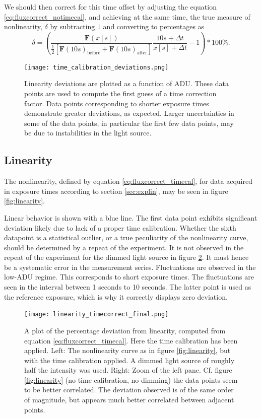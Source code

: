\documentclass[../main.tex]{subfiles}
\begin{document}
We should then correct for this time offset by adjusting the equation \ref{eq:fluxcorrect_notimecal}, and achieving at the same time, the true measure of nonlinearity, $\delta$ by subtracting $1$ and converting to percentages as 
		\begin{equation}\label{eq:fluxcorrect_timecal}
		\delta = \left( \frac{\bm F(x [s])}{\frac12\left[\bm F(10s)_\text{before}+\bm F(10s)_\text{after}\right]}\frac{10s + \Delta t}{x [s] + \Delta t} - 1 \right) * 100\%.
		\end{equation}
	
		\begin{figure}[h!]
		\centering			\texttt{[image: time\_calibration\_deviations.png]}
		\caption{Linearity deviations are plotted as a function of ADU. These data points are used to compute the first guess of a time correction factor. Data points corresponding to shorter exposure times demonstrate greater deviations, as expected. Larger uncertainties in some of the data points, in particular the first few data points, may be due to instabilities in the light source. }
		\label{fig:timecaldev}
	\end{figure}
		
		\subsection{Linearity}
		The nonlinearity, defined by equation \ref{eq:fluxcorrect_timecal}, for data acquired in exposure times according to section \ref{sec:explin}, may be seen in figure \ref{fig:linearity}. 
		
		Linear behavior is shown with a blue line. The first data point exhibits significant deviation likely due to lack of a proper time calibration. Whether the sixth datapoint is a statistical outlier, or a true peculiarity of the nonlinearity curve, should be determined by a repeat of the experiment. It is not observed in the repeat of the experiment for the dimmed light source in figure \ref{fig:linearitydim}. It must hence be a systematic error in the measurement series. Fluctuations are observed in the low-ADU regime. This corresponds to short exposure times. The fluctuations are seen in the interval between 1 seconds to 10 seconds. The latter point is used as the reference exposure, which is why it correctly displays zero deviation. 
		
		\begin{figure}
			\centering			\texttt{[image: linearity\_timecorrect\_final.png]}
			\caption{A plot of the percentage deviation from linearity, computed from equation \ref{eq:fluxcorrect_timecal}. Here the time calibration has been applied. Left: The nonlinearity curve as in figure \ref{fig:linearity}, but with the time calibration applied. A dimmed light source of roughly half the intensity was used. Right: Zoom of the left pane. Cf. figure \ref{fig:linearity} (no time calibration, no dimming) the data points seem to be better correlated. The deviation observed is of the same order of magnitude, but appears much better correlated between adjacent points. }
			\label{fig:linearitydim}
		\end{figure}
		
\end{document}
